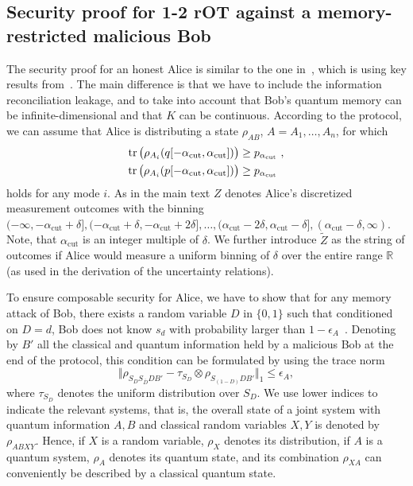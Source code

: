 \documentclass[aps,amsfonts,twoside,amssymb,superscriptaddress,twocolumn]{revtex4-1}
\newcommand{\tr}{\operatorname{tr}}
\def\tr{\mathop{\rm tr}\nolimits}
\begin{document}
\subsection{Security proof for 1-2 rOT against a memory-restricted malicious Bob} \label{sec:SecurityProof}
The security proof for an honest Alice is similar to the one in~\cite{schaffner2010}, which is using key results from~\cite{Wehner2010,Koenig2012}. The main difference is that we have to include the information reconciliation leakage, and to take into account that Bob's quantum memory can be infinite-dimensional and that $K$ can be continuous. According to the protocol, we can assume that Alice is distributing a state $\rho_{AB}$, $A=A_1,\ldots,A_n$, for which 
\begin{align}\label{eq:Cutoff}
    \tr\big(\rho_{A_i}(q[-\alpha_\text{cut},\alpha_\text{cut}]) \big) &\geq p_{\alpha_\text{cut}}\ , \\ 
    \tr\big(\rho_{A_i}(p[-\alpha_\text{cut},\alpha_\text{cut}]) \big) &\geq p_{\alpha_\text{cut}}
\end{align}
holds for any mode $i$. As in the main text $Z$ denotes Alice's discretized measurement outcomes with the binning $(-\infty,-\alpha_\text{cut} + \delta],(-\alpha_\text{cut}+\delta,-\alpha_\text{cut}+2\delta],\ldots,(\alpha_\text{cut}-2\delta, \alpha_\text{cut}-\delta], (\alpha_\text{cut}-\delta,\infty)$. Note, that $\alpha_\text{cut}$ is an integer multiple of $\delta$. We further introduce $\tilde Z$ as the string of outcomes if Alice would measure a uniform binning of $\delta$ over the entire range $\mathbb R$ (as used in the derivation of the uncertainty relations).

To ensure composable security for Alice, we have to show that for any memory attack of Bob, there exists a random variable $D$ in $\{0,1\}$ such that conditioned on $D=d$, Bob does not know $s_{ d}$ with probability larger than $1-\epsilon_A$~\cite{Koenig2012}. Denoting by $B'$ all the classical and quantum information held by a malicious Bob at the end of the protocol, this condition can be formulated by using the trace norm
\begin{equation}\label{eq:SecA2}
   \Vert \rho_{S_{D}S_{\bar D} D B'} - \tau_{S_D} \otimes \rho_{S_{(1-D)} D B'} \Vert_1 \leq \epsilon_A ,
\end{equation}
where $\tau_{S_D}$ denotes the uniform distribution over $S_D$. We use lower indices to indicate the relevant systems, that is, the overall state of a joint system with quantum information $A,B$ and classical random variables $X,Y$ is denoted by $\rho_{ABXY}$. Hence, if $X$ is a random variable, $\rho_X$ denotes its distribution, if $A$ is a quantum system, $\rho_A$ denotes its quantum state, and its combination $\rho_{XA}$ can conveniently be described by a classical quantum state. 
\end{document}
